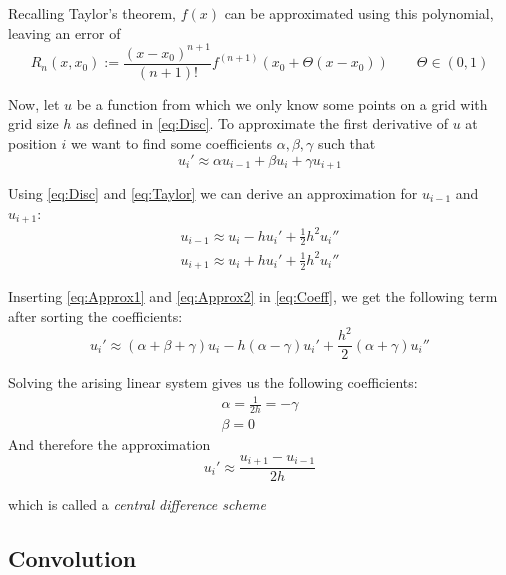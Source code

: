 Recalling Taylor's theorem, $f(x)$ can be approximated using this polynomial, leaving an error of
\begin{equation}
    R_n(x, x_0) := \frac{(x-x_0)^{n+1}}{(n+1)!}f^{(n+1)}(x_0 + \Theta(x-x_0))\qquad \Theta \in(0,1)
\end{equation}

Now, let $u$ be a function from which we only know some points on a grid with grid size $h$ as 
defined in \ref{eq:Disc}. To approximate the first derivative of $u$ at position $i$ we want to
find some coefficients $\alpha, \beta, \gamma$ such that
\begin{equation}\label{eq:Coeff}
    u_i' \approx \alpha u_{i-1} + \beta u_i + \gamma u_{i+1}
\end{equation}


Using \ref{eq:Disc} and \ref{eq:Taylor} we can derive an approximation for $u_{i-1}$ and $u_{i+1}$:
\begin{gather}
    u_{i-1} \approx u_i - hu_i' + \frac{1}{2}h^2u_i''\label{eq:Approx1}\\
    u_{i+1} \approx u_i + hu_i' + \frac{1}{2}h^2u_i''\label{eq:Approx2}
\end{gather}

Inserting \ref{eq:Approx1} and \ref{eq:Approx2} in \ref{eq:Coeff}, we get the following term after sorting the
coefficients:
\begin{equation}
    u_i' \approx (\alpha + \beta + \gamma) u_i -h (\alpha - \gamma)u_i' + \frac{h^2}{2}(\alpha +
    \gamma)u_i''
\end{equation}

Solving the arising linear system gives us the following coefficients:
\begin{gather}
    \alpha = \frac{1}{2h} = -\gamma\\
    \beta = 0
\end{gather}
And therefore the approximation
\begin{equation}
    u_i' \approx \frac{u_{i+1} - u_{i-1}}{2h}
\end{equation}

which is called a \textit{central difference scheme}


\subsection*{Convolution}

